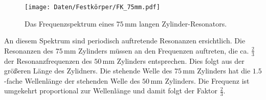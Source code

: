 \begin{figure}[H]
    \centering
    \texttt{[image: Daten/Festkörper/FK\_75mm.pdf]}
    \caption{Das Frequenzspektrum eines $75 \,\si{\milli\metre}$ langen Zylinder-Resonators. }
    \label{fig:fkp75mm}
\end{figure}
An diesem Spektrum sind periodisch auftretende Resonanzen ersichtlich. Die Resonanzen des $75 \,\si{\milli\metre}$ Zylinders müssen an den Frequenzen auftreten, die ca. $\frac{2}{3}$ der Resonanzfrequenzen des $50 \,\si{\milli\metre}$ Zylinders entsprechen. 
Dies folgt aus der größeren Länge des Zylidners. Die stehende Welle des $75 \,\si{\milli\metre}$ Zylinders hat die $1.5$-fache Wellenlänge der stehenden Welle des $50 \,\si{\milli\metre}$ Zylinders. Die Frequenz ist umgekehrt proportional zur Wellenlänge und damit folgt der Faktor $\frac{2}{3}$.

